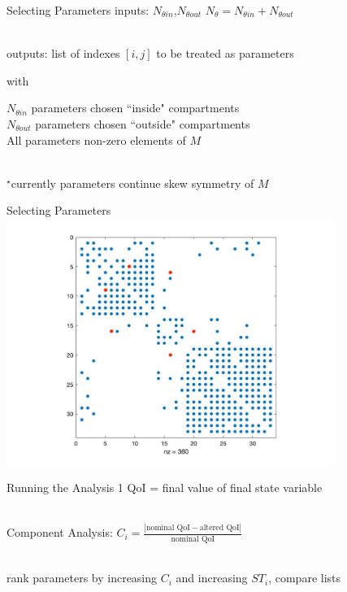 \documentclass{beamer}
\begin{document}
\begin{frame}{Selecting Parameters}
	inputs: $N_{\theta in}$,$N_{\theta out}$ \quad \quad \quad \quad $N_\theta=N_{\theta in}+N_{\theta out}$
	
	~\\
	
	outputs: list of indexes $[i,j]$ to be treated as parameters
	
	with
	
	$N_{\theta in}$ parameters chosen ``inside" compartments \\
	$N_{\theta out}$ parameters chosen ``outside" compartments \\
	All parameters non-zero elements of $M$
	
	~\\
	
	$^\star$currently parameters continue skew symmetry of $M$
	
\end{frame}


\begin{frame}{Selecting Parameters}
	\centering
	\includegraphics[width=0.8\textwidth]{spy_1b.jpg}
\end{frame}

\begin{frame}{Running the Analysis 1}
	QoI = final value of final state variable
	
	~\\
	
	Component Analysis: $C_i=\frac{|\text{nominal QoI} - \text{altered QoI}|}{\text{nominal QoI}}$
	
	~\\
	
	rank parameters by increasing $C_i$ and increasing $ST_i$, compare lists
\end{frame}
\end{document}
